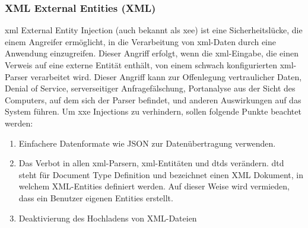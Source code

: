 \subsubsection{XML External Entities (XML)}

\acs{xml} External Entity Injection (auch bekannt als \acs{xee}) ist eine
Sicherheitslücke, die einem Angreifer ermöglicht, in die Verarbeitung
von \acs{xml}-Daten durch eine Anwendung einzugreifen. Dieser Angriff
erfolgt, wenn die \acs{xml}-Eingabe, die einen Verweis auf eine externe
Entität enthält, von einem schwach konfigurierten \acs{xml}-Parser
verarbeitet wird. Dieser Angriff kann zur Offenlegung vertraulicher
Daten, Denial of Service, serverseitiger Anfragefälschung,
Portanalyse aus der Sicht des Computers, auf dem sich der Parser
befindet, und anderen Auswirkungen auf das System führen. Um \acs{xxe}
Injections zu verhindern, sollen folgende Punkte beachtet werden:


\begin{enumerate}
    \item Einfachere Datenformate wie JSON zur Datenübertragung verwenden.
    \item Das Verbot in allen \acs{xml}-Parsern, \acs{xml}-Entitäten
     und \acs{dtd}s verändern. \acs{dtd} steht für Document Type Definition und
     bezeichnet einen XML Dokument, in welchem XML-Entities
     definiert werden. Auf dieser Weise wird vermieden,
     dass ein Benutzer eigenen Entities erstellt.
    \item Deaktivierung des Hochladens von XML-Dateien
\end{enumerate}
